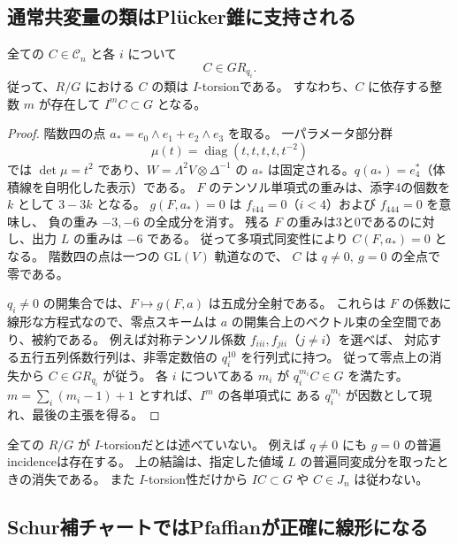 \subsection{通常共変量の類はPl\"ucker錐に支持される}

\begin{lemma}[階数四開集合での通常像所属]
\label{lem:v17-rank-four-support}
全ての $C\in\mathcal C_n$ と各 $i$ について
\[
 C\in G R_{q_i}.
\]
従って、$R/G$ における $C$ の類は $I$-torsionである。
すなわち、$C$ に依存する整数 $m$ が存在して
$I^mC\subset G$ となる。
\end{lemma}

\begin{proof}
階数四の点
$a_*=e_0\wedge e_1+e_2\wedge e_3$ を取る。
一パラメータ部分群
\[
 \mu(t)=\operatorname{diag}(t,t,t,t,t^{-2})
\]
では $\det\mu=t^2$ であり、$W=\Lambda^2V\otimes\Delta^{-1}$ の
$a_*$ は固定される。$q(a_*)=e_4^*$（体積線を自明化した表示）である。
$F$ のテンソル単項式の重みは、添字4の個数を $k$ として $3-3k$ となる。
$g(F,a_*)=0$ は $f_{i44}=0$（$i<4$）および $f_{444}=0$ を意味し、
負の重み $-3,-6$ の全成分を消す。
残る $F$ の重みは3と0であるのに対し、出力 $L$ の重みは $-6$ である。
従って多項式同変性により $C(F,a_*)=0$ となる。
階数四の点は一つの $\mathrm{GL}(V)$ 軌道なので、
$C$ は $q\ne0,\ g=0$ の全点で零である。

$q_i\ne0$ の開集合では、$F\mapsto g(F,a)$ は五成分全射である。
これらは $F$ の係数に線形な方程式なので、零点スキームは
$a$ の開集合上のベクトル束の全空間であり、被約である。
例えば対称テンソル係数 $f_{iii},f_{jii}$（$j\ne i$）を選べば、
対応する五行五列係数行列は、非零定数倍の $q_i^{10}$ を行列式に持つ。
従って零点上の消失から $C\in GR_{q_i}$ が従う。
各 $i$ についてある $m_i$ が $q_i^{m_i}C\in G$ を満たす。
$m=\sum_i(m_i-1)+1$ とすれば、$I^m$ の各単項式に
ある $q_i^{m_i}$ が因数として現れ、最後の主張を得る。
\end{proof}

\begin{remark}[支持を意味する範囲]
全ての $R/G$ が $I$-torsionだとは述べていない。
例えば $q\ne0$ にも $g=0$ の普遍incidenceは存在する。
上の結論は、指定した値域 $L$ の普遍同変成分を取ったときの消失である。
また $I$-torsion性だけから $IC\subset G$ や $C\in J_n$ は従わない。
\end{remark}

\subsection{Schur補チャートではPfaffianが正確に線形になる}

